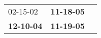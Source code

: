 \begin{supertabular}{p{0.33\columnwidth}p{0.33\columnwidth}p{0.33\columnwidth}}
          02-15-02\textsuperscript{} &  \textbf{11-18-05\textsuperscript{}} \\
 \textbf{12-10-04\textsuperscript{}} &  \textbf{11-19-05\textsuperscript{}} \\
\end{supertabular}
